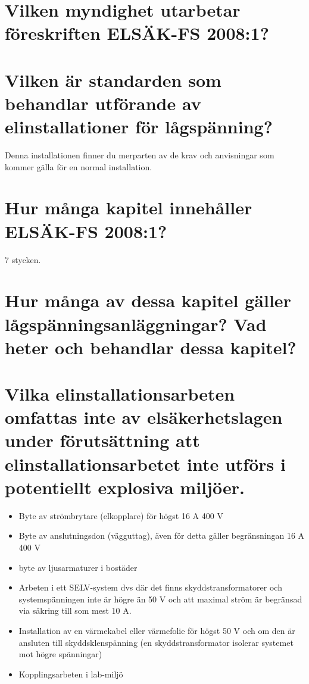 \documentclass[a4paper,swedish]{article}
\begin{document}
\section{Vilken myndighet utarbetar föreskriften ELSÄK-FS 2008:1?}

\section{Vilken är standarden som behandlar utförande av elinstallationer för lågspänning?}
\label{sec:q_65}

Denna installationen finner du merparten av de krav och anvisningar som kommer gälla för en normal installation.

\section{Hur många kapitel innehåller ELSÄK-FS 2008:1?}

7 stycken.

\section{Hur många av dessa kapitel gäller lågspänningsanläggningar? Vad heter och behandlar dessa kapitel?}
\label{sec:q_67}

\section{Vilka elinstallationsarbeten omfattas inte av elsäkerhetslagen under förutsättning att elinstallationsarbetet inte utförs i potentiellt explosiva miljöer.}

\begin{itemize}
\item Byte av strömbrytare (elkopplare) för högst 16 A 400 V
\item Byte av anslutningsdon (vägguttag), även för detta gäller begränsningan 16 A 400 V
\item byte av ljusarmaturer i bostäder
\item Arbeten i ett SELV-system dvs där det finns skyddstransformatorer och systemspänningen inte är högre än 50 V
  och att maximal ström är begränsad via säkring till som mest 10 A.
\item Installation av en värmekabel eller värmefolie för högst 50 V och om den är ansluten till skyddsklenspänning (en skyddstransformator isolerar systemet mot högre spänningar)
\item Kopplingsarbeten i lab-miljö
\end{itemize}
\end{document}
